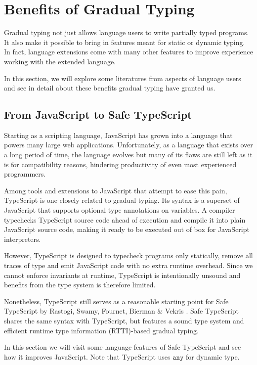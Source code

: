 
\section{Benefits of Gradual Typing}

Gradual typing not just allows language users to write partially typed programs.
It also make it possible to bring in features meant for static or dynamic typing.
In fact, language extensions come with many other features to
improve experience working with the extended language.

In this section, we will explore some literatures
from aspects of language users and see in detail about these benefits
gradual typing have granted us.

\subsection{From JavaScript to Safe TypeScript}

Starting as a scripting language, JavaScript has grown into a language
that powers many large web applications.
Unfortunately, as a language that exists over a long period of time,
the language evolves but many of its flaws are still left as it is for compatibility reasons,
hindering productivity of even most experienced programmers.

Among tools and extensions to JavaScript that attempt to ease this pain,
TypeScript is one closely related to gradual typing.
Its syntax is a superset of JavaScript that supports optional type annotations on variables.
A compiler typechecks TypeScript source code ahead of execution
and compile it into plain JavaScript source code,
making it ready to be executed out of box for JavaScript interpreters.

However, TypeScript is designed to typecheck programs only
statically, remove all traces of type and emit JavaScript code with no extra runtime overhead.
Since we cannot enforce invariants at runtime, TypeScript is intentionally unsound
and benefits from the type system is therefore limited.

Nonetheless, TypeScript still serves as a reasonable starting point
for Safe TypeScript by Rastogi, Swamy, Fournet, Bierman \& Vekris \cite{rastogi2015safe}.
Safe TypeScript shares the same syntax with TypeScript,
but features a sound type system and efficient runtime type information (RTTI)-based
gradual typing.

In this section we will visit some language features of Safe TypeScript and see how it improves JavaScript. Note that TypeScript uses $\texttt{any}$ for dynamic type.


